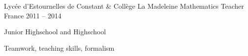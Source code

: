 \begin{cventries}








	\cventrysix
	{Lycée d'Estournelles de Constant \& Coll\`{e}ge La Madeleine} %
	{Mathematics Teacher} %
	{France} %
	{2011 -- 2014} %
	{
		\begin{cvitems} %
			\item {Junior Highschool and Highschool}
		\end{cvitems}
	}%
	{Teamwork, teaching skills, formalism}



\end{cventries}
